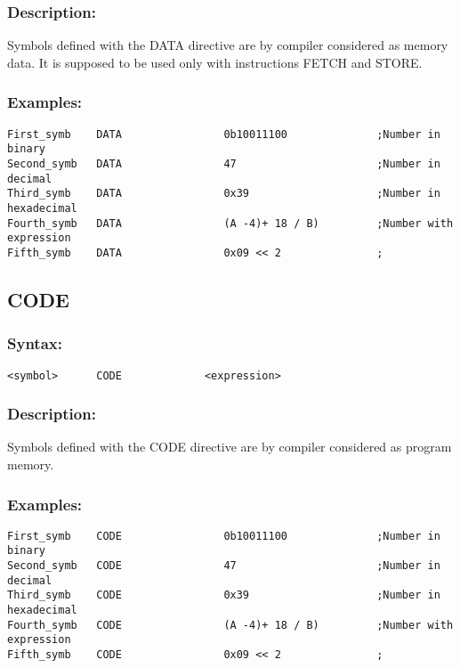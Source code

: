         \subsubsection{Description:}
            Symbols defined with the DATA directive are by compiler considered as memory data. It is supposed to be used only with instructions FETCH and STORE.

        \subsubsection{Examples:}
        {
            \usecodefont
            \verb'First_symb    DATA                0b10011100              ;Number in binary'\\
            \verb'Second_symb   DATA                47                      ;Number in decimal'\\
            \verb'Third_symb    DATA                0x39                    ;Number in hexadecimal'\\
            \verb'Fourth_symb   DATA                (A -4)+ 18 / B)         ;Number with expression'\\
            \verb'Fifth_symb    DATA                0x09 << 2               ;'\\
        }

    \subsection{CODE}
        \subsubsection{Syntax:}
        {
            \usecodefont
            \verb'<symbol>      CODE             <expression>'
        }

        \subsubsection{Description:}
            Symbols defined with the CODE directive are by compiler considered as program memory.

        \subsubsection{Examples:}
        {
            \usecodefont
            \verb'First_symb    CODE                0b10011100              ;Number in binary'\\
            \verb'Second_symb   CODE                47                      ;Number in decimal'\\
            \verb'Third_symb    CODE                0x39                    ;Number in hexadecimal'\\
            \verb'Fourth_symb   CODE                (A -4)+ 18 / B)         ;Number with expression'\\
            \verb'Fifth_symb    CODE                0x09 << 2               ;'\\
        }


